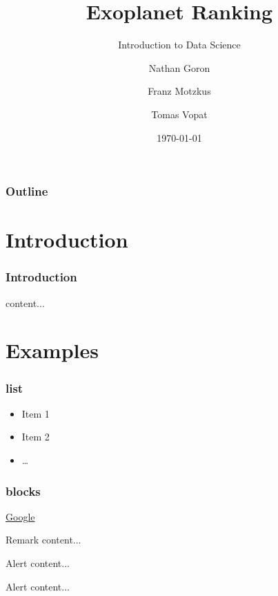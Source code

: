 \documentclass[aspectratio=169]{beamer}
\title{Exoplanet Ranking}
\subtitle{Introduction to Data Science}
\author[Goron, Motzkus, Vopat]{Nathan Goron \and Franz Motzkus \and Tomas Vopat}
\institute[HY]{University of Helsinki}
\date{\today}
\begin{document}
\begin{frame}
    \titlepage
\end{frame}

\begin{frame}
    \frametitle{Outline}
    \tableofcontents
\end{frame}

\section{Introduction}

\begin{frame}
    \frametitle{Introduction}
    content...
\end{frame}

\section{Examples}

\begin{frame}
    \frametitle{list}

    \begin{itemize}
        \item Item 1
        \item Item 2
        \item \dots
    \end{itemize}

\end{frame}


\begin{frame}
    \frametitle{blocks}
    
    \href{www.google.com}{Google}

    \begin{block}{Remark}
        content...
    \end{block}

    \begin{alertblock}{Alert}
        content...
    \end{alertblock}

    \begin{examples}{Alert}
        content...
    \end{examples}
        
\end{frame}
\end{document}

